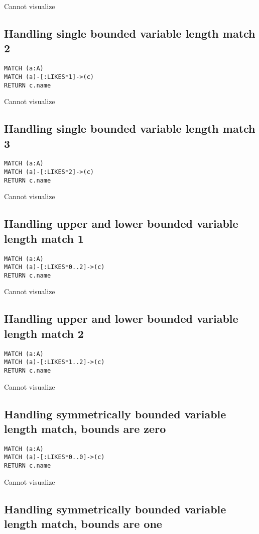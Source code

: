 Cannot visualize
\subsection{Handling single bounded variable length match 2}

\begin{lstlisting}
MATCH (a:A)
MATCH (a)-[:LIKES*1]->(c)
RETURN c.name
\end{lstlisting}

Cannot visualize
\subsection{Handling single bounded variable length match 3}

\begin{lstlisting}
MATCH (a:A)
MATCH (a)-[:LIKES*2]->(c)
RETURN c.name
\end{lstlisting}

Cannot visualize
\subsection{Handling upper and lower bounded variable length match 1}

\begin{lstlisting}
MATCH (a:A)
MATCH (a)-[:LIKES*0..2]->(c)
RETURN c.name
\end{lstlisting}

Cannot visualize
\subsection{Handling upper and lower bounded variable length match 2}

\begin{lstlisting}
MATCH (a:A)
MATCH (a)-[:LIKES*1..2]->(c)
RETURN c.name
\end{lstlisting}

Cannot visualize
\subsection{Handling symmetrically bounded variable length match, bounds are zero}

\begin{lstlisting}
MATCH (a:A)
MATCH (a)-[:LIKES*0..0]->(c)
RETURN c.name
\end{lstlisting}

Cannot visualize
\subsection{Handling symmetrically bounded variable length match, bounds are one}

